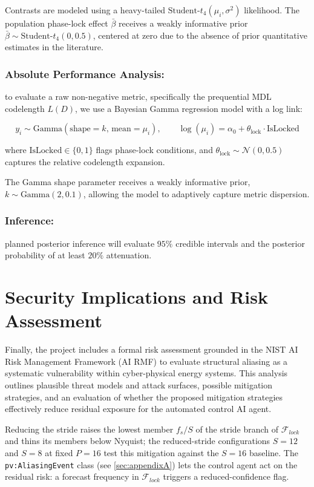 Contrasts are modeled using a heavy-tailed $\text{Student-}t_4(\mu_i, \sigma^2)$ likelihood. The population phase-lock effect $\bar{\beta}$ receives a weakly informative prior $\bar{\beta} \sim \text{Student-}t_4(0, 0.5)$, centered at zero due to the absence of prior quantitative estimates in the literature.

\subsubsection{Absolute Performance Analysis:} to evaluate a raw non-negative metric, specifically the prequential MDL codelength $L(D)$, we use a Bayesian Gamma regression model with a log link:

\begin{equation}
y_i 
\sim 
\text{Gamma}(\text{shape} = k, \, \text{mean} = \mu_i),
\qquad
\log(\mu_i)
=
\alpha_0 
+ 
\theta_{\text{lock}} 
\cdot 
\text{IsLocked}
\end{equation}

where $\text{IsLocked} \in \{0, 1\}$ flags phase-lock conditions, and $\theta_{\text{lock}} \sim \mathcal{N}(0, 0.5)$ captures the relative codelength expansion. 

The Gamma shape parameter receives a weakly informative prior, $k \sim \text{Gamma}(2, 0.1)$, allowing the model to adaptively capture metric dispersion.

\subsubsection{Inference:} planned posterior inference will evaluate $95\%$ credible intervals and the posterior probability of at least $20\%$ attenuation.

\section{Security Implications and Risk Assessment}
Finally, the project includes a formal risk assessment grounded in the NIST AI Risk Management Framework (AI RMF)\cite{tabassiArtificialIntelligenceRisk2023} to evaluate structural aliasing as a systematic vulnerability within cyber-physical energy systems. This analysis outlines plausible threat models and attack surfaces, possible mitigation strategies, and an evaluation of whether the proposed mitigation strategies effectively reduce residual exposure for the automated control AI agent. 

Reducing the stride raises the lowest member $f_s/S$ of the stride branch of $\mathcal{F}_{lock}$ and thins its members below Nyquist; the reduced-stride configurations $S=12$ and $S=8$ at fixed $P=16$ test this mitigation against the $S{=}16$ baseline. The \texttt{pv:AliasingEvent} class (see \autoref{sec:appendixA}) lets the control agent act on the residual risk: a forecast frequency in $\mathcal{F}_{lock}$ triggers a reduced-confidence flag.

